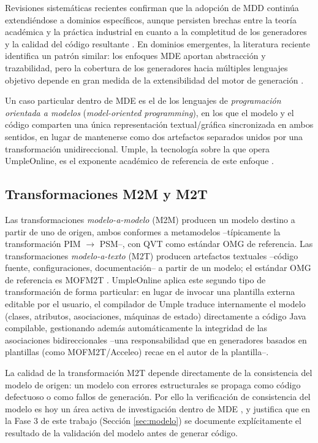\documentclass[11pt,a4paper]{article}
\begin{document}
Revisiones sistem\'aticas recientes confirman que la adopci\'on de MDD contin\'ua extendi\'endose a dominios espec\'ificos, aunque persisten brechas entre la teor\'ia acad\'emica y la pr\'actica industrial en cuanto a la completitud de los generadores y la calidad del c\'odigo resultante \cite{shamsujjoha2021}. En dominios emergentes, la literatura reciente identifica un patr\'on similar: los enfoques MDE aportan abstracci\'on y trazabilidad, pero la cobertura de los generadores hacia m\'ultiples lenguajes objetivo depende en gran medida de la extensibilidad del motor de generaci\'on \cite{naveed2024}.

Un caso particular dentro de MDE es el de los lenguajes de \emph{programaci\'on orientada a modelos} (\emph{model-oriented programming}), en los que el modelo y el c\'odigo comparten una \'unica representaci\'on textual/gr\'afica sincronizada en ambos sentidos, en lugar de mantenerse como dos artefactos separados unidos por una transformaci\'on unidireccional. Umple, la tecnolog\'ia sobre la que opera UmpleOnline, es el exponente acad\'emico de referencia de este enfoque \cite{lethbridge2021umple}.

\subsection{Transformaciones M2M y M2T}
Las transformaciones \emph{modelo-a-modelo} (M2M) producen un modelo destino a partir de uno de origen, ambos conformes a metamodelos --t\'ipicamente la transformaci\'on PIM $\to$ PSM--, con QVT como est\'andar OMG de referencia. Las transformaciones \emph{modelo-a-texto} (M2T) producen artefactos textuales --c\'odigo fuente, configuraciones, documentaci\'on-- a partir de un modelo; el est\'andar OMG de referencia es MOFM2T \cite{omg2008mofm2t}. UmpleOnline aplica este segundo tipo de transformaci\'on de forma particular: en lugar de invocar una plantilla externa editable por el usuario, el compilador de Umple traduce internamente el modelo (clases, atributos, asociaciones, m\'aquinas de estado) directamente a c\'odigo Java compilable, gestionando adem\'as autom\'aticamente la integridad de las asociaciones bidireccionales --una responsabilidad que en generadores basados en plantillas (como MOFM2T/Acceleo) recae en el autor de la plantilla--.

La calidad de la transformaci\'on M2T depende directamente de la consistencia del modelo de origen: un modelo con errores estructurales se propaga como c\'odigo defectuoso o como fallos de generaci\'on. Por ello la verificaci\'on de consistencia del modelo es hoy un \'area activa de investigaci\'on dentro de MDE \cite{marchezan2022}, y justifica que en la Fase 3 de este trabajo (Secci\'on \ref{sec:modelo}) se documente expl\'icitamente el resultado de la validaci\'on del modelo antes de generar c\'odigo.
\end{document}
